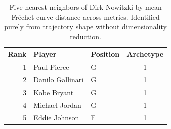 \begin{table}[htbp]
  \centering\small
  \begin{tabular}{rllc}
    \toprule
    Rank & Player & Position & Archetype \\
    \midrule
    1 & Paul Pierce & G & 1 \\
    2 & Danilo Gallinari & G & 1 \\
    3 & Kobe Bryant & G & 1 \\
    4 & Michael Jordan & G & 1 \\
    5 & Eddie Johnson & F & 1 \\
    \bottomrule
  \end{tabular}
  \caption{Five nearest neighbors of Dirk Nowitzki by mean Fr\'{e}chet curve distance across metrics. Identified purely from trajectory shape without dimensionality reduction.}
  \label{tab:Dirk_Nowitzki_frechet_curve_neighbors}
\end{table}

